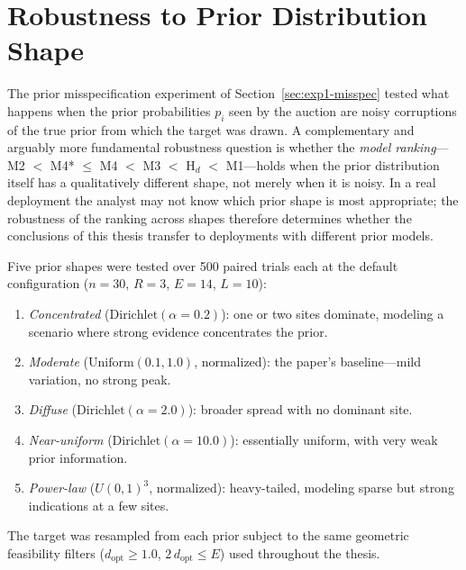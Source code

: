 \section{Robustness to Prior Distribution Shape}\label{sec:exp7-prior-shape}

The prior misspecification experiment of Section~\ref{sec:exp1-misspec}
tested what happens when the prior probabilities $p_i$ seen by the auction
are noisy corruptions of the true prior from which the target was drawn.
A complementary and arguably more fundamental robustness question is
whether the \emph{model ranking}---M2 $<$ M4* $\leq$ M4 $<$ M3 $<$
H$_d$ $<$ M1---holds when the prior distribution itself has a
qualitatively different shape, not merely when it is noisy.
In a real deployment the analyst may not know which prior shape is
most appropriate; the robustness of the ranking across shapes therefore
determines whether the conclusions of this thesis transfer to
deployments with different prior models.

Five prior shapes were tested over 500 paired trials each at the default
configuration ($n = 30$, $R = 3$, $E = 14$, $L = 10$):

\begin{enumerate}
    \item \emph{Concentrated} ($\mathrm{Dirichlet}(\alpha = 0.2)$): one
          or two sites dominate, modeling a scenario where strong evidence
          concentrates the prior.
    \item \emph{Moderate} ($\mathrm{Uniform}(0.1, 1.0)$, normalized):
          the paper's baseline---mild variation, no strong peak.
    \item \emph{Diffuse} ($\mathrm{Dirichlet}(\alpha = 2.0)$): broader
          spread with no dominant site.
    \item \emph{Near-uniform} ($\mathrm{Dirichlet}(\alpha = 10.0)$):
          essentially uniform, with very weak prior information.
    \item \emph{Power-law} ($U(0,1)^3$, normalized): heavy-tailed,
          modeling sparse but strong indications at a few sites.
\end{enumerate}

The target was resampled from each prior subject to the same geometric
feasibility filters ($d_{\mathrm{opt}} \geq 1.0$,
$2\,d_{\mathrm{opt}} \leq E$) used throughout the thesis.

